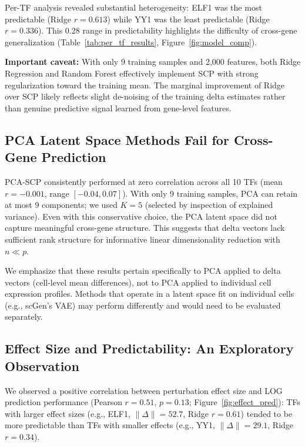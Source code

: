 \documentclass[12pt,number,sort&compress]{elsarticle}
\begin{document}
Per-TF analysis revealed substantial heterogeneity: ELF1 was the most
predictable (Ridge $r = 0.613$) while YY1 was the least predictable
(Ridge $r = 0.336$). This 0.28 range in predictability highlights the
difficulty of cross-gene generalization (Table~\ref{tab:per_tf_results},
Figure~\ref{fig:model_comp}).

\textbf{Important caveat:} With only 9 training samples and 2,000 features,
both Ridge Regression and Random Forest effectively implement SCP with
strong regularization toward the training mean. The marginal improvement
of Ridge over SCP likely reflects slight de-noising of the training delta
estimates rather than genuine predictive signal learned from gene-level features.

\subsection{PCA Latent Space Methods Fail for Cross-Gene Prediction}
\label{sec:pca_failure}

PCA-SCP consistently performed at zero correlation across all 10 TFs
(mean $r = -0.001$, range $[-0.04, 0.07]$). With only 9 training samples,
PCA can retain at most 9 components; we used $K = 5$ (selected by inspection
of explained variance). Even with this conservative choice, the PCA latent
space did not capture meaningful cross-gene structure. This suggests that
delta vectors lack sufficient rank structure for informative linear
dimensionality reduction with $n \ll p$.

We emphasize that these results pertain specifically to PCA applied to
delta vectors (cell-level mean differences), not to PCA applied to
individual cell expression profiles. Methods that operate in a latent space
fit on individual cells (e.g., scGen's VAE) may perform differently and
would need to be evaluated separately.

\subsection{Effect Size and Predictability: An Exploratory Observation}
\label{sec:effect_predictability}

We observed a positive correlation between perturbation effect size and
LOG prediction performance (Pearson $r = 0.51$, $p = 0.13$;
Figure~\ref{fig:effect_pred}): TFs with larger effect sizes (e.g., ELF1,
$\|\Delta\| = 52.7$, Ridge $r = 0.61$) tended to be more predictable than
TFs with smaller effects (e.g., YY1, $\|\Delta\| = 29.1$, Ridge $r = 0.34$).
\end{document}
